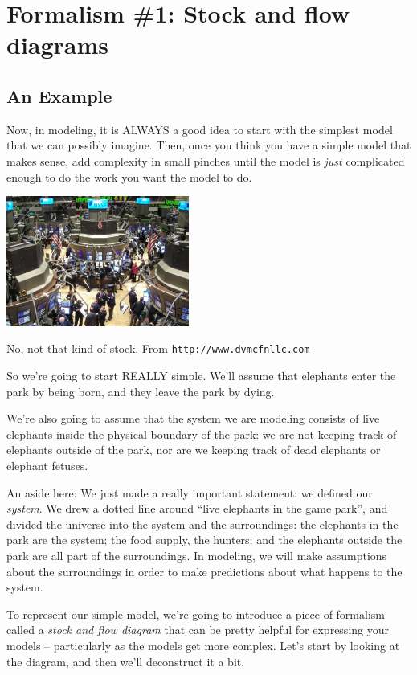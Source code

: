 \section{Formalism \#1: Stock and flow diagrams}

\subsection{An Example}

Now, in modeling, it is ALWAYS a good idea to start with the simplest model that we can possibly imagine.  Then, once you think you have a simple model that makes sense, add complexity in small pinches until the model is {\it just} complicated enough to do the work you want the model to do.

\begin{marginfigure}
\includegraphics[width=6cm]{figs/stockmarket}
\caption{No, not that kind of stock. From {\tt http://www.dvmcfnllc.com}}
\end{marginfigure}

So we're going to start REALLY simple.  We'll assume that elephants enter the park by being born, and they leave the park by dying.  

We're also going to assume that the system we are modeling consists of live elephants inside the physical boundary of the park:  we are not keeping track of elephants outside of the park, nor are we keeping track of dead elephants or elephant fetuses.

An aside here:  We just made a really important statement:  we defined our {\it system}.  We drew a dotted line around ``live elephants in the game park'', and divided the universe into the system and the surroundings:  the elephants in the park are the system; the food supply, the hunters; and the elephants outside the park are all part of the surroundings.  In modeling, we will make assumptions about the surroundings in order to make predictions about what happens to the system.    

To represent our simple model, we're going to introduce a piece of formalism called a {\it stock and flow diagram} that can be pretty helpful for expressing your models -- particularly as the models get more complex.  Let's start by looking at the diagram, and then we'll deconstruct it a bit.

